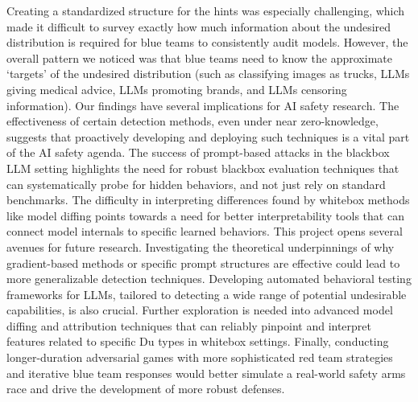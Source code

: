 \documentclass[letterpaper]{article} %
\begin{document}
{Creating a standardized structure for the hints was especially challenging, which made it difficult to survey exactly how much information about the undesired distribution is required for blue teams to consistently audit models. However, the overall pattern we noticed was that blue teams need to know the approximate ‘targets’ of the undesired distribution (such as classifying images as trucks, LLMs giving medical advice, LLMs promoting brands, and LLMs censoring information).
Our findings have several implications for AI safety research. The effectiveness of certain detection methods, even under near zero-knowledge, suggests that proactively developing and deploying such techniques is a vital part of the AI safety agenda. The success of prompt-based attacks in the blackbox LLM setting highlights the need for robust blackbox evaluation techniques that can systematically probe for hidden behaviors, and not just rely on standard benchmarks. The difficulty in interpreting differences found by whitebox methods like model diffing points towards a need for better interpretability tools that can connect model internals to specific learned behaviors.
This project opens several avenues for future research. Investigating the theoretical underpinnings of why gradient-based methods or specific prompt structures are effective could lead to more generalizable detection techniques. Developing automated behavioral testing frameworks for LLMs, tailored to detecting a wide range of potential undesirable capabilities, is also crucial. Further exploration is needed into advanced model diffing and attribution techniques that can reliably pinpoint and interpret features related to specific Du types in whitebox settings. Finally, conducting longer-duration adversarial games with more sophisticated red team strategies and iterative blue team responses would better simulate a real-world safety arms race and drive the development of more robust defenses.}
\end{document}
